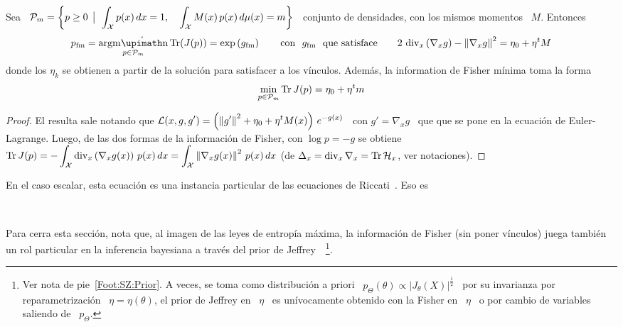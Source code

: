 %
\begin{lema}
\label{Lem:SZ:MinFisherRiccati}
%
Sea  \  $\displaystyle  \mathcal{P}_m =  \left\{  p  \ge  0  \:\: \big| \:\:   \int_{\mathcal{X}} p(x)  \,  dx  =
  1,  \quad  \int_{\mathcal{X}} M(x)  \,  p(x)  \, d\mu(x)  =  m  \right\}$ \  conjunto  de
  densidades, con los mismos momentos \ $M$. Entonces
  \[
  p_{\mathrm{fm}}      =     \argmin_{p      \in      \P_m}     \Tr(J(p))      =
  \exp\left( g_{\mathrm{fm}} \right)   \qquad  \mbox{con   \   $g_{\mathrm{fm}}$  \   que
  satisface} \qquad 2 \, \div_x\left( \nabla_x g \right) - \left\| \nabla_x g \right\|^2 = \eta_0 + \eta^t M
  \]
  donde los $\eta_k$ se obtienen a partir de la soluci\'on para satisfacer a los
  v\'inculos. Adem\'as, la information de Fisher m\'inima toma la forma
%
\[
\min_{p \in \mathcal{P}_m} \operatorname{Tr} J(p) = \eta_0 + \eta^t m
\]
%
\end{lema}
%
\begin{proof}
El resulta  sale notando  que $\displaystyle  \mathcal{L}(x ,  g ,  g') =  \left( \left\|
  g'  \right\|^2 +  \eta_0 +  \eta^t M(x)  \right)  \, e^{-  g(x) }$  \ con  $g'
  = \nabla_x g $ \ que que se pone en la ecuaci\'on de Euler-Lagrange. Luego, de
  las dos formas  de la informaci\'on de Fisher,  con $\log p = -  g$ se obtiene
  $\displaystyle \operatorname{Tr}  J(p) = -  \int_{\mathcal{X}} \operatorname{div}_x  \left( \nabla_x g(x)  \right) \,
  p(x) \,  dx =  \int_{\mathcal{X}} \left\|  \nabla_x g(x)  \right\|^2 \,  p(x) \,  dx$ (de
  $\Delta_x = \operatorname{div}_x \nabla_x = \operatorname{Tr} \mathcal{H}_x$, ver notaciones).
\end{proof}

En  el  caso  escalar,  esta  ecuaci\'on es  una  instancia  particular  de  las
ecuaciones de Riccati~\cite{Ric1724, Ric59}. Eso es





\

Para  cerra esta  secci\'on, nota  que,  al imagen  de las  leyes de  entrop\'ia
m\'axima, la informaci\'on  de Fisher (sin poner v\'inculos)  juega tambi\'en un
rol   particular  en   la  inferencia   bayesiana  a   trav\'es  del   prior  de
Jeffrey~\cite{Jef46,    Jef48,    LehCas98,   Rob07}~\footnote{Ver    nota    de
pie~\ref{Foot:SZ:Prior}.   A  veces, se  toma  como  distribuci\'on a  priori  \
$p_\Theta(\theta)  \propto  |J_\theta(X)|^\frac12$  \   por  su  invarianza  por
reparametrizaci\'on  \ $\eta  =  \eta(\theta)$, \ie  el prior  de  Jeffrey en  \
$\eta$ \ es un\'ivocamente obtenido con la Fisher  en \ $\eta$ \ o por cambio de
variables saliendo de \ $p_\Theta$.}.


